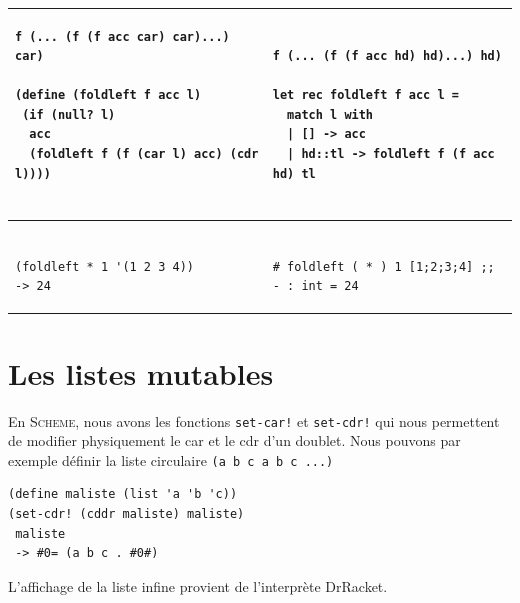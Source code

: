 \begin{footnotesize}
\begin{tabular}{l|l}
\begin{minipage}{2.8in}
\begin{Verbatim}
f (... (f (f acc car) car)...) car)

(define (foldleft f acc l)
 (if (null? l)
  acc
  (foldleft f (f (car l) acc) (cdr l))))
  
\end{Verbatim}
\end{minipage}
&
\begin{minipage}{2.8in}
\begin{Verbatim}

f (... (f (f acc hd) hd)...) hd)

let rec foldleft f acc l =
  match l with
  | [] -> acc
  | hd::tl -> foldleft f (f acc hd) tl
  
\end{Verbatim}
\end{minipage} \\ \hline
\begin{minipage}{2.8in}
\begin{Verbatim}

(foldleft * 1 '(1 2 3 4))
-> 24

\end{Verbatim}
\end{minipage}
&
\begin{minipage}{3.0in}
\begin{Verbatim}

# foldleft ( * ) 1 [1;2;3;4] ;;
- : int = 24

\end{Verbatim}
\end{minipage} 

\end{tabular}

\end{footnotesize}
\section{Les listes mutables}

En \textsc{Scheme}, nous avons les fonctions \texttt{set-car!} et \texttt{set-cdr!} 
qui nous permettent de modifier physiquement le car et le cdr d'un doublet.
Nous pouvons par exemple définir la liste circulaire \texttt{(a b c a b c ...)}
\begin{verbatim}
(define maliste (list 'a 'b 'c))
(set-cdr! (cddr maliste) maliste)
 maliste
 -> #0= (a b c . #0#)
\end{verbatim}
L'affichage de la liste infine provient de l'interprète DrRacket.


